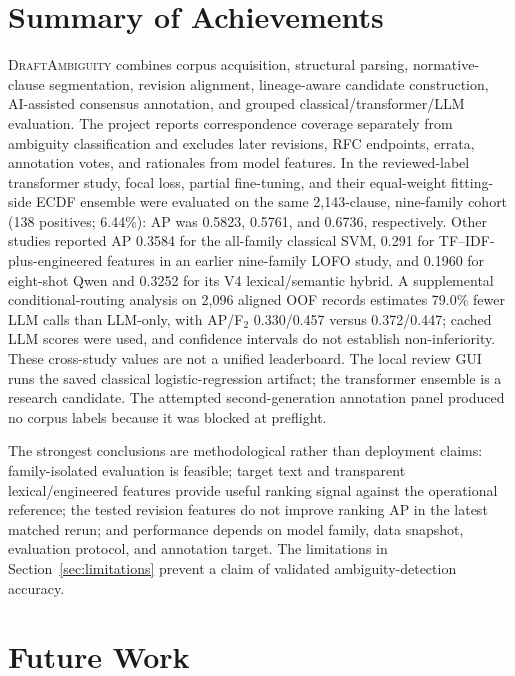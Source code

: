 \documentclass[12pt,a4paper,oneside]{report}
\newcommand{\system}{\textsc{DraftAmbiguity}}
\begin{document}
\section{Summary of Achievements}

\system{} combines corpus acquisition, structural parsing, normative-clause segmentation, revision alignment, lineage-aware candidate construction, AI-assisted consensus annotation, and grouped classical/transformer/LLM evaluation. The project reports correspondence coverage separately from ambiguity classification and excludes later revisions, RFC endpoints, errata, annotation votes, and rationales from model features. In the reviewed-label transformer study, focal loss, partial fine-tuning, and their equal-weight fitting-side ECDF ensemble were evaluated on the same 2,143-clause, nine-family cohort (138 positives; 6.44\%): AP was 0.5823, 0.5761, and 0.6736, respectively. Other studies reported AP 0.3584 for the all-family classical SVM, 0.291 for TF--IDF-plus-engineered features in an earlier nine-family LOFO study, and 0.1960 for eight-shot Qwen and 0.3252 for its V4 lexical/semantic hybrid. A supplemental conditional-routing analysis on 2,096 aligned OOF records estimates 79.0\% fewer LLM calls than LLM-only, with AP/F$_2$ 0.330/0.457 versus 0.372/0.447; cached LLM scores were used, and confidence intervals do not establish non-inferiority. These cross-study values are not a unified leaderboard. The local review GUI runs the saved classical logistic-regression artifact; the transformer ensemble is a research candidate. The attempted second-generation annotation panel produced no corpus labels because it was blocked at preflight.

The strongest conclusions are methodological rather than deployment claims: family-isolated evaluation is feasible; target text and transparent lexical/engineered features provide useful ranking signal against the operational reference; the tested revision features do not improve ranking AP in the latest matched rerun; and performance depends on model family, data snapshot, evaluation protocol, and annotation target. The limitations in Section~\ref{sec:limitations} prevent a claim of validated ambiguity-detection accuracy.

\section{Future Work}
\end{document}
